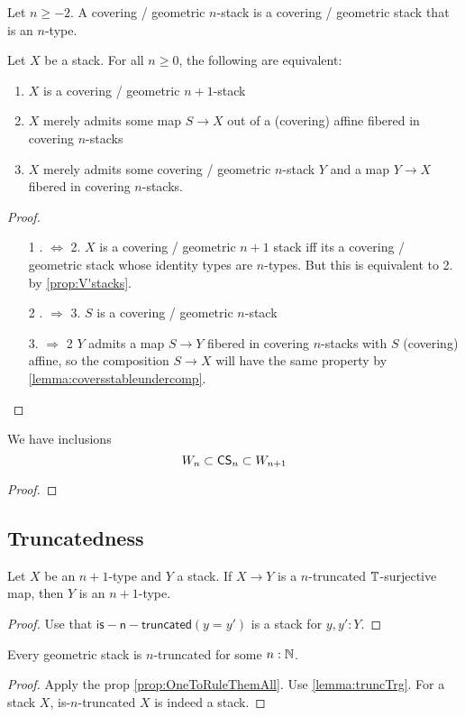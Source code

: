 \begin{definition}
	Let $n \ge -2$. A covering / geometric $n$-stack is a covering / geometric stack that is an $n$-type.
\end{definition}
\begin{prop}{\label{prop:nstack}}
	Let $X$ be a stack. For all $n \ge 0$, the following are equivalent:
	\begin{enumerate}
		\item $X$ is a covering / geometric $n+1$-stack
		\item $X$ merely admits some map $S \to X$ out of a (covering) affine fibered in covering $n$-stacks
		\item $X$ merely admits some covering / geometric $n$-stack $Y$ and a map $Y \to X$ fibered in covering $n$-stacks.
	\end{enumerate}
\end{prop}
\begin{proof}
	\
	\begin{enumerate}
		\item[1 . $\Leftrightarrow$ 2.]
		$X$ is a covering / geometric $n+1$ stack iff its a covering / geometric stack whose identity types are $n$-types. But this is equivalent to 2. by \ref{prop:V'stacks}.
		\item[2 . $\Rightarrow$ 3.]
		$S$ is a covering / geometric $n$-stack
		\item [3. $\Rightarrow$ 2]
		$Y$ admits a map $S \to Y$  fibered in covering $n$-stacks with $S$ (covering) affine, so the composition $S \to X$ will have the same property by \ref{lemma:coversstableundercomp}.
	\end{enumerate}
\end{proof}
\begin{prop}
	We have inclusions 
	\[W_n \subset \mathsf{CS}_{n} \subset W_{n+1}\]
\end{prop}
\begin{proof}
	
\end{proof}

\subsection{Truncatedness}
\begin{lemma}{\label{lemma:truncTrg}}
	Let $X$ be an $n+1$-type and $Y$ a stack. If $X \to Y$ is a $n$-truncated $\mathbb{T}$-surjective map, then $Y$ is an $n+1$-type.
\end{lemma}
\begin{proof}
	Use that $\mathsf{is-n-truncated} (y=y')$ is a stack for $y , y' : Y.$
\end{proof}

\begin{corollary}
	Every geometric stack is $n$-truncated for some $n : \mathbb{N}$.
\end{corollary}
\begin{proof}
	Apply the prop \ref{prop:OneToRuleThemAll}. Use \ref{lemma:truncTrg}. For a stack $X$, is-$n$-truncated $X$ is indeed a stack.
\end{proof}
